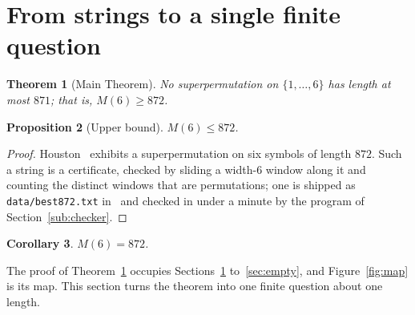 \documentclass[10pt]{article}
\newtheorem{theorem}{Theorem}[section]
\newtheorem{proposition}[theorem]{Proposition}
\newtheorem{corollary}[theorem]{Corollary}
\theoremstyle{remark}
\theoremstyle{plain}
\newcommand{\prog}[1]{\texttt{#1}}
\begin{document}
\section{From strings to a single finite question}\label{sec:reduction}

\begin{theorem}[Main Theorem]\label{thm:main}
No superpermutation on $\{1,\dots,6\}$ has length at most $871$; that
is, $M(6)\ge 872$.
\end{theorem}

\begin{proposition}[Upper bound]\label{prop:upper}
$M(6)\le 872$.
\end{proposition}

\begin{proof}
Houston~\cite{Houston14} exhibits a superpermutation on six symbols of
length $872$.  Such a string is a certificate, checked by sliding a
width-$6$ window along it and counting the distinct windows that are
permutations; one is shipped as
\prog{data/\allowbreak best872.txt} in~\cite{REPO} and checked in under
a minute by the program of Section~\ref{sub:checker}.
\end{proof}

\begin{corollary}\label{cor:main}
$M(6)=872$.
\end{corollary}

The proof of Theorem~\ref{thm:main} occupies
Sections~\ref{sec:reduction} to~\ref{sec:empty}, and
Figure~\ref{fig:map} is its map.  This section turns the theorem into
one finite question about one length.
\end{document}
